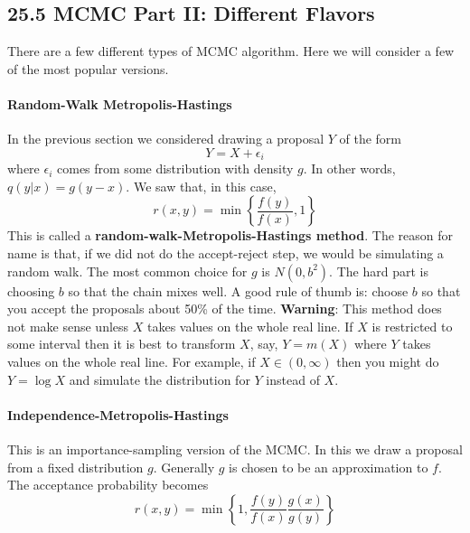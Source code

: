 \subsection*{25.5 MCMC Part II: Different Flavors}\label{mcmc-part-ii-different-flavors}
There are a few different types of MCMC algorithm. Here we will consider
a few of the most popular versions.
\paragraph{Random-Walk Metropolis-Hastings}\label{random-walk-metropolis-hastings}
In the previous section we considered drawing a proposal \(Y\) of the
form
\[
Y = X + \epsilon_{i}
\]
where \(\epsilon_{i}\) comes from some distribution with density \(g\). In
other words, \(q(y | x) = g(y - x)\). We saw that, in this case,
\[
r(x, y) = \min \left\{ \frac{f(y)}{f(x)}, 1 \right\}
\]
This is called a \textbf{random-walk-Metropolis-Hastings method}. The
reason for name is that, if we did not do the accept-reject step, we
would be simulating a random walk. The most common choice for \(g\) is
\(N(0, b^{2})\). The hard part is choosing \(b\) so that the chain mixes
well. A good rule of thumb is: choose \(b\) so that you accept the
proposals about 50\% of the time.
\textbf{Warning}: This method does not make sense unless \(X\) takes
values on the whole real line. If \(X\) is restricted to some interval
then it is best to transform \(X\), say, \(Y = m(X)\) where \(Y\) takes
values on the whole real line. For example, if \(X \in (0, \infty)\)
then you might do \(Y = \log X\) and simulate the distribution for \(Y\)
instead of \(X\).
\paragraph{Independence-Metropolis-Hastings}\label{independence-metropolis-hastings}
This is an importance-sampling version of the MCMC. In this we draw a
proposal from a fixed distribution \(g\). Generally \(g\) is chosen to
be an approximation to \(f\). The acceptance probability becomes
\[
r(x, y) = \min \left\{ 1, \frac{f(y)}{f(x)} \frac{g(x)}{g(y)} \right\}
\]
